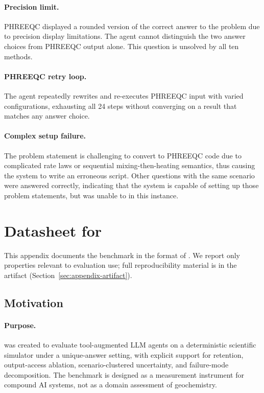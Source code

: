 \documentclass{article}
\begin{document}
\paragraph{Precision limit.}
PHREEQC displayed a rounded version of the correct answer to the problem due to precision display limitations. The agent cannot distinguish the two answer choices from PHREEQC output alone. This question is unsolved by all ten methods.

\paragraph{PHREEQC retry loop.}
The agent repeatedly rewrites and re-executes PHREEQC input with varied configurations, exhausting all 24 steps without converging on a result that matches any answer choice.

\paragraph{Complex setup failure.}
The problem statement is challenging to convert to PHREEQC code due to complicated rate laws or sequential mixing-then-heating semantics, thus causing the system to write an erroneous script. Other questions with the same scenario were answered correctly, indicating that the system is capable of setting up those problem statements, but was unable to in this instance.

\section{Datasheet for \texorpdfstring{\BenchName}{PHREEQC-MCQ-200}}
\label{sec:appendix-datasheet}

This appendix documents the benchmark in the format of \citep{gebru2021datasheets}. We report only properties relevant to evaluation use; full reproducibility material is in the artifact (Section~\ref{sec:appendix-artifact}).

\subsection{Motivation}

\paragraph{Purpose.}
\BenchName{} was created to evaluate tool-augmented LLM agents on a deterministic scientific simulator under a unique-answer setting, with explicit support for retention, output-access ablation, scenario-clustered uncertainty, and failure-mode decomposition. The benchmark is designed as a measurement instrument for compound AI systems, not as a domain assessment of geochemistry.
\end{document}
